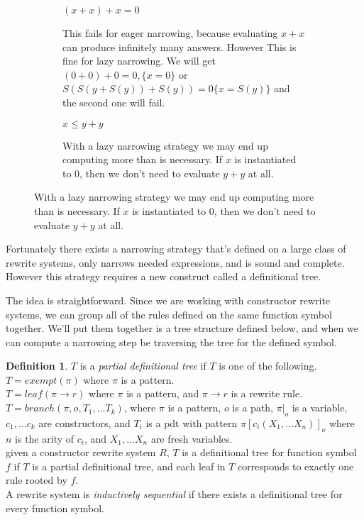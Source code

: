 \documentclass{article}
\theoremstyle{definition}
\newtheorem{definition}{Definition}[section]
\begin{document}
\begin{figure}[h]
  \begin{subfigure}{.6\textwidth}
      $(x + x) + x = 0$
    \caption{This fails for eager narrowing, because evaluating $x + x$ can produce infinitely many answers.
             However This is fine for lazy narrowing. We will get
             $(0 + 0) + 0 = 0, \{x = 0\}$
             or $S(S(y + S(y)) + S(y)) = 0 \{x = S(y)\}$
             and the second one will fail.}
  \end{subfigure}
  \begin{subfigure}{.6\textwidth}
      $x \le y + y$
    \caption{With a lazy narrowing strategy we may end up computing more than is necessary.
             If $x$ is instantiated to $0$, then we don't need to evaluate $y + y$ at all.}
  \end{subfigure}
    \label{NarrowingComp}
\end{figure}


Fortunately there exists a narrowing strategy that's defined on a large class of rewrite systems,
only narrows needed expressions, and is sound and complete.
However this strategy requires a new construct called a definitional tree.

The idea is straightforward.  Since we are working with constructor rewrite systems,
we can group all of the rules defined on the same function symbol together.
We'll put them together is a tree structure defined below, and 
when we can compute a narrowing step be traversing the tree for the defined symbol.


\theoremstyle{definition}
\begin{definition}
    $T$ is a \textit{partial definitional tree} if $T$ is one of the following.\\
    $T = exempt(\pi)$ where $\pi$ is a pattern.\\
    $T = leaf(\pi \to r)$ where $\pi$ is a pattern, and $\pi \to r$ is a rewrite rule.\\
    $T = branch(\pi, o, T_1, \ldots T_k)$, where $\pi$ is a pattern,
    $o$ is a path,
    $\pi|_o$ is a variable,
    $c_1,\ldots c_k$ are constructors,
    and $T_i$ is a pdt with pattern $\pi[c_i(X_1,\ldots X_n)]_o$ where $n$ is the arity of $c_i$,
    and $X_1,\ldots X_n$ are fresh variables.\\
    $\ $\\
    given a constructor rewrite system $R$,
    $T$ is a definitional tree for function symbol $f$ if
    $T$ is a partial definitional tree, and each leaf in $T$ corresponds to exactly one rule rooted by $f$.
    $\ $\\
    A rewrite system is \textit{inductively sequential} if there exists a definitional tree for every function symbol.
\end{definition}
\end{document}
